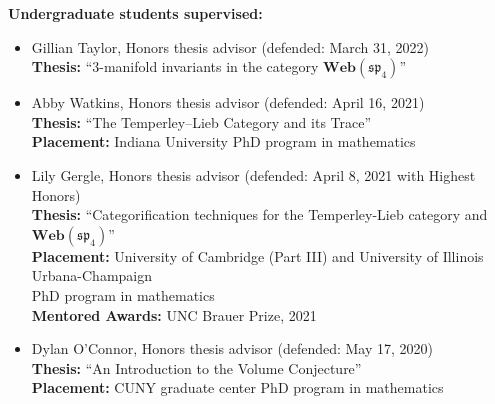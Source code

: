 \documentclass[10pt]{article}
\begin{document}
\smallskip
\noindent\textbf{Undergraduate students supervised:}
\begin{itemize}

\item Gillian Taylor, Honors thesis advisor (defended: March 31, 2022) \\
\noindent\textbf{Thesis:} ``$3$-manifold invariants in the category $\mathbf{Web}(\mathfrak{sp}_4)$''


\item Abby Watkins, Honors thesis advisor (defended: April 16, 2021) \\
\noindent\textbf{Thesis:} ``The Temperley--Lieb Category and its Trace'' \\
\noindent \textbf{Placement:} Indiana University PhD program in mathematics

\item Lily Gergle, Honors thesis advisor (defended: April 8, 2021 with Highest Honors) \\
\noindent\textbf{Thesis:} ``Categorification techniques for the Temperley-Lieb category and $\mathbf{Web}(\mathfrak{sp}_4)$'' \\
\noindent \textbf{Placement:} University of Cambridge (Part III) and University of Illinois Urbana-Champaign \\ 
PhD program in mathematics \\
\textbf{Mentored Awards:} UNC Brauer Prize, 2021

\item Dylan O'Connor, Honors thesis advisor (defended: May 17, 2020) \\
\noindent\textbf{Thesis:} ``An Introduction to the Volume Conjecture'' \\
\noindent \textbf{Placement:} CUNY graduate center PhD program in mathematics

\end{itemize}
\end{document}
